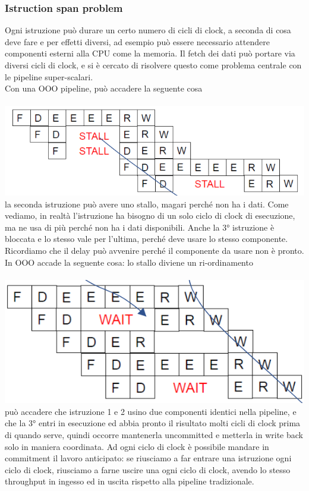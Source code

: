 \documentclass[12pt, oneside]{extbook}
\begin{document}
\subsubsection{Istruction span problem}
Ogni istruzione può durare un certo numero di cicli di clock, a seconda di cosa deve fare e per effetti diversi, ad esempio può essere necessario attendere componenti esterni alla CPU come la memoria. Il fetch dei dati può portare via diversi cicli di clock, e si è cercato di risolvere questo come problema centrale con le pipeline super-scalari.\\ Con una OOO pipeline, può accadere la seguente cosa\\\\
\includegraphics[scale=0.5]{immagini/ooo-pipeline-1}\\
la seconda istruzione può avere uno stallo, magari perché non ha i dati. Come vediamo, in realtà l'istruzione ha bisogno di un solo ciclo di clock di esecuzione, ma ne usa di più perché non ha i dati disponibili. Anche la 3° istruzione è bloccata e lo stesso vale per l'ultima, perché deve usare lo stesso componente. Ricordiamo che il delay può avvenire perché il componente da usare non è pronto.\\ In OOO accade la seguente cosa: lo stallo diviene un ri-ordinamento\\\\
\includegraphics[scale=0.5]{immagini/ooo-pipeline-2}\\
può accadere che istruzione 1 e 2 usino due componenti identici nella pipeline, e che la 3° entri in esecuzione ed abbia pronto il risultato molti cicli di clock prima di quando serve, quindi occorre mantenerla uncommitted e metterla in write back solo in maniera coordinata. Ad ogni ciclo di clock è possibile mandare in commitment il lavoro anticipato: se riusciamo a far entrare una istruzione ogni ciclo di clock, riusciamo a farne uscire una ogni ciclo di clock, avendo lo stesso throughput in ingesso ed in uscita rispetto alla pipeline tradizionale.
\end{document}
